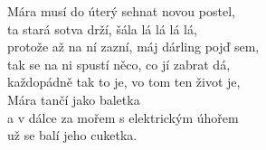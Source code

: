 \vspace{-2 pt}
\ve{}
Mára musí do úterý sehnat novou postel,\\
ta stará sotva drží, šála lá lá lá lá,\\
protože až na ní zazní, máj dárling pojď sem,\\
tak se na ni spustí něco, co jí zabrat dá,\\
každopádně tak to je, vo tom ten život je,\\
Mára tančí jako baletka\\
a v dálce za mořem s elektrickým úhořem\\
už se balí jeho cuketka.

\vspace{-2 pt}
\cho{}

\esong
\pagestyle{plain}
\restoregeometry{}